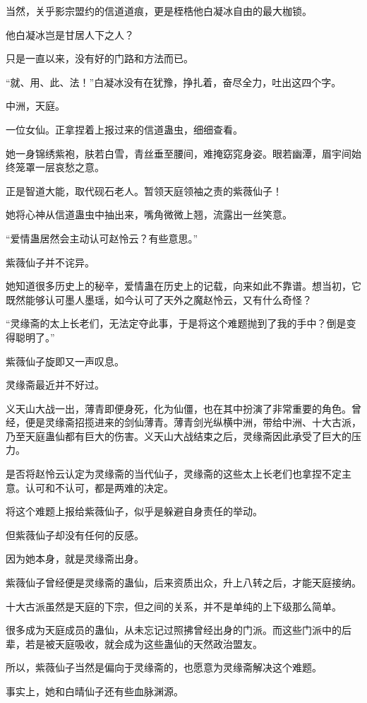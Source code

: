 \begin{this_body}
当然，关乎影宗盟约的信道道痕，更是桎梏他白凝冰自由的最大枷锁。

他白凝冰岂是甘居人下之人？

只是一直以来，没有好的门路和方法而已。

“就、用、此、法！”白凝冰没有在犹豫，挣扎着，奋尽全力，吐出这四个字。

中洲，天庭。

一位女仙。正拿捏着上报过来的信道蛊虫，细细查看。

她一身锦绣紫袍，肤若白雪，青丝垂至腰间，难掩窈窕身姿。眼若幽潭，眉宇间始终笼罩一层哀愁之意。

正是智道大能，取代砚石老人。暂领天庭领袖之责的紫薇仙子！

她将心神从信道蛊虫中抽出来，嘴角微微上翘，流露出一丝笑意。

“爱情蛊居然会主动认可赵怜云？有些意思。”

紫薇仙子并不诧异。

她知道很多历史上的秘辛，爱情蛊在历史上的记载，向来如此不靠谱。想当初，它既然能够认可墨人墨瑶，如今认可了天外之魔赵怜云，又有什么奇怪？

“灵缘斋的太上长老们，无法定夺此事，于是将这个难题抛到了我的手中？倒是变得聪明了。”

紫薇仙子旋即又一声叹息。

灵缘斋最近并不好过。

义天山大战一出，薄青即便身死，化为仙僵，也在其中扮演了非常重要的角色。曾经，便是灵缘斋招揽进来的剑仙薄青。薄青剑光纵横中洲，带给中洲、十大古派，乃至天庭蛊仙都有巨大的伤害。义天山大战结束之后，灵缘斋因此承受了巨大的压力。

是否将赵怜云认定为灵缘斋的当代仙子，灵缘斋的这些太上长老们也拿捏不定主意。认可和不认可，都是两难的决定。

将这个难题上报给紫薇仙子，似乎是躲避自身责任的举动。

但紫薇仙子却没有任何的反感。

因为她本身，就是灵缘斋出身。

紫薇仙子曾经便是灵缘斋的蛊仙，后来资质出众，升上八转之后，才能天庭接纳。

十大古派虽然是天庭的下宗，但之间的关系，并不是单纯的上下级那么简单。

很多成为天庭成员的蛊仙，从未忘记过照拂曾经出身的门派。而这些门派中的后辈，若是被天庭吸收，就会成为这些蛊仙的天然政治盟友。

所以，紫薇仙子当然是偏向于灵缘斋的，也愿意为灵缘斋解决这个难题。

事实上，她和白晴仙子还有些血脉渊源。


\end{this_body}
